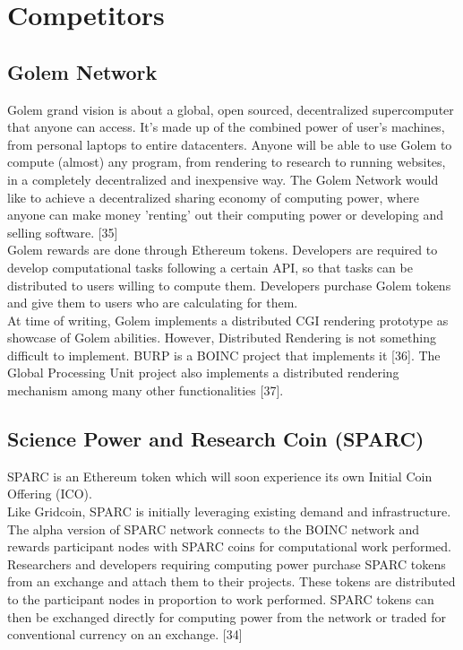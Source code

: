 \section{Competitors}

\subsection{Golem Network}

Golem grand vision is about a global, open sourced, decentralized supercomputer that anyone can access. It's made up of the combined power of user's machines, from personal laptops to entire datacenters. Anyone will be able to use Golem to compute (almost) any program, from rendering to research to running websites, in a completely decentralized and inexpensive way. The Golem Network would like to achieve a decentralized sharing economy of computing power, where anyone can make money 'renting' out their computing power or developing and selling software. [35]\\

Golem rewards are done through Ethereum tokens. Developers are required to develop computational tasks following a certain API, so that tasks can be distributed to users willing to compute them. Developers purchase Golem tokens and give them to users who are calculating for them.\\

At time of writing, Golem implements a distributed CGI rendering prototype as showcase of Golem abilities. However, Distributed Rendering is not something difficult to implement. BURP is a BOINC project that implements it [36]. The Global Processing Unit project also implements a distributed rendering mechanism among many other functionalities [37].\\


\subsection{Science Power and Research Coin (SPARC)}

SPARC is an Ethereum token which will soon experience its own Initial Coin Offering (ICO).\\

Like Gridcoin, SPARC is initially leveraging existing demand and infrastructure.
The alpha version of SPARC network
connects to the BOINC network and rewards participant nodes with SPARC coins for computational work performed. Researchers and developers requiring
computing power purchase SPARC tokens from an exchange and attach them to their projects.
These tokens are distributed to the participant nodes in proportion to work performed. SPARC
tokens can then be exchanged directly for computing power from the network or traded for
conventional currency on an exchange. [34]\\


